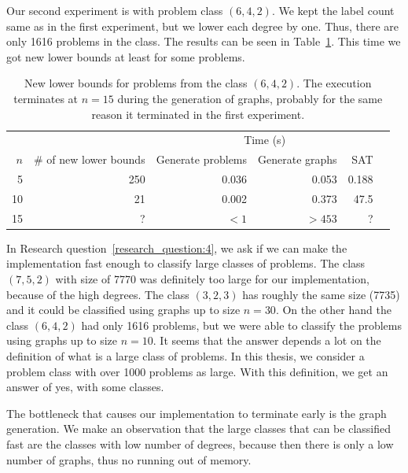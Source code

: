 Our second experiment is with problem class $(6,4,2)$.
We kept the label count same as in the first experiment, but we lower each degree by one.
Thus, there are only 1616 problems in the class.
The results can be seen in Table~\ref{tbl:results:new_lower_bounds_for_classes:6_4_2}.
This time we got new lower bounds at least for some problems.
\begin{table}[H]
    \centering
    \begin{tabular}{rrrrrr}
        \toprule
        && \multicolumn{3}{c}{Time (s)} \\
        \cmidrule{3-5}
        $n$ & \# of new lower bounds & Generate problems & Generate graphs & SAT\\
        \midrule
        5  & 250  & 0.036  & 0.053  & 0.188\\
        10 & 21 & 0.002 & 0.373 & 47.5\phantom{00} \\
        15 & ? & $<1$\phantom{.000} & $>453$\phantom{.000} & ? \\
        \bottomrule
    \end{tabular}
    \caption{%
    New lower bounds for problems from the class $(6,4,2)$.
    The execution terminates at $n=15$ during the generation of graphs, probably for the same reason it terminated in the first experiment.
    }
    \label{tbl:results:new_lower_bounds_for_classes:6_4_2}
\end{table}

In Research question~\ref{research_question:4}, we ask if we can make the implementation fast enough to classify large classes of problems.
The class $(7,5,2)$ with size of 7770 was definitely too large for our implementation, because of the high degrees.
The class $(3,2,3)$ has roughly the same size (7735) and it could be classified using graphs up to size $n=30$.
On the other hand the class $(6,4,2)$ had only 1616 problems, but we were able to classify the problems using graphs up to size $n=10$.
It seems that the answer depends a lot on the definition of what is a large class of problems.
In this thesis, we consider a problem class with over 1000 problems as large.
With this definition, we get an answer of yes, with some classes.

The bottleneck that causes our implementation to terminate early is the graph generation.
We make an observation that the large classes that can be classified fast are the classes with low number of degrees, because then there is only a low number of graphs, thus no running out of memory.
